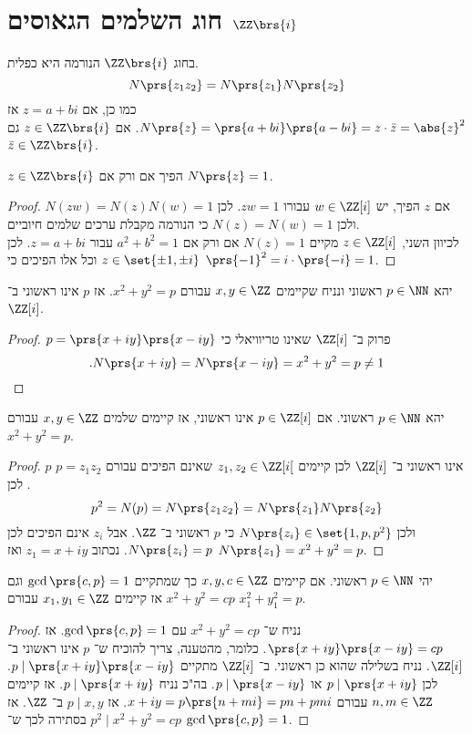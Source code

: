 \documentclass[a4paper,10pt,twoside,openany]{book}
\begin{document}
\section{חוג השלמים הגאוסים
$\ZZ\brs{i}$}
\begin{remark}
בחוג
$\ZZ\brs{i}$
הנורמה היא כפלית.
\[N\prs{z_1 z_2} = N\prs{z_1} N\prs{z_2}\]
כמו כן, אם
$z = a+bi$
אז
$N\prs{z} = \prs{a+bi}\prs{a-bi}=z\cdot\bar{z} = \abs{z}^2$.
אם
$z \in \ZZ\brs{i}$
גם
$\bar{z} \in \ZZ\brs{i}$.
\end{remark}
\begin{proposition}
$z \in \ZZ\brs{i}$
הפיך אם ורק אם
$N\prs{z} = 1$.
\end{proposition}
\begin{proof}
אם
$z$
הפיך, יש
$w \in \ZZ[i]$
עבורו
$zw = 1$.
לכן
$N(zw) = N(z)N(w) = 1$
ולכן
$N(z) = N(w) = 1$
כי הנורמה מקבלת ערכים שלמים חיוביים.\\
לכיוון השני,
$z \in \ZZ[i]$
מקיים
$N(z) = 1$
אם ורק אם
$a^2 + b^2 = 1$
עבור
$z = a+bi$.
לכן
$z \in \set{\pm 1, \pm i}$
וכל אלו הפיכים כי
$\prs{-1}^2 = i \cdot \prs{-i} = 1$.
\end{proof}
\begin{proposition}
יהא
$p \in \NN$
ראשוני ונניח שקיימים
$x,y \in \ZZ$
עבורם
$x^2 + y^2 = p$.
אז
$p$
אינו ראשוני ב־%
$\ZZ[i]$.
\end{proposition}
\begin{proof}
$p = \prs{x+iy}\prs{x-iy}$
פרוק ב־%
$\ZZ[i]$
שאינו טריוויאלי כי
\[\text{.} N\prs{x+iy} = N\prs{x-iy} = x^2 + y^2 = p \neq 1\]
\end{proof}
\begin{proposition}
יהא
$p \in \NN$
ראשוני.
אם
$p \in \ZZ[i]$
אינו ראשוני, אז קיימים שלמים
$x,y \in \ZZ$
עבורם
$x^2 + y^2 = p$.
\end{proposition}
\begin{proof}
$p$
אינו ראשוני ב־%
$\ZZ[i]$
לכן קיימים
$z_1,z_2 \in \ZZ[i[$
שאינם הפיכים עבורם
$p = z_1 z_2$.
לכן
\[p^2 = N(p) = N\prs{z_1 z_2} = N\prs{z_1} N\prs{z_2}\]
ולכן
$N\prs{z_i} \in \set{1,p,p^2}$
כי
$p$
ראשוני ב־%
$\ZZ$.
אבל
$z_i$
אינם הפיכים לכן
$N\prs{z_i} = p$.
נכתוב
$z_1 = x+iy$
ואז
$N\prs{z_1} = x^2 + y^2 = p$.
\end{proof}
\begin{theorem}
יהי
$p \in \NN$
ראשוני.
אם קיימים
$x,y,c \in \ZZ$
כך שמתקיים
$\gcd\prs{c,p}=1$
וגם
$x^2 + y^2 = cp$
אז קיימים
$x_1,y_1 \in \ZZ$
עבורם
$x_1^2 + y_1^2 = p$.
\end{theorem}
\begin{proof}
נניח ש־%
$x^2 + y^2 = cp$
עם
$\gcd\prs{c,p} = 1$.
אז
$\prs{x+iy}\prs{x-iy} = cp$.
כלומר, מהטענה, צריך להוכיח ש־%
$p$
אינו ראשוני ב־%
$\ZZ[i]$.
נניח בשלילה שהוא כן ראשוני.
ב־%
$\ZZ[i]$
מתקיים
$p \mid \prs{x+iy}\prs{x-iy}$.
לכן
$p \mid \prs{x+iy}$
או
$p \mid \prs{x-iy}$.
בה"כ נניח
$p \mid \prs{x+iy}$.
אז קיימים
$n,m \in \ZZ$
עבורם
$x+iy = p\prs{n+mi} = pn + pmi$.
אז
$p \mid x,y$
ב־%
$\ZZ$.
אז
$p^2 \mid x^2 + y^2 = cp$
בסתירה לכך ש־%
$\gcd\prs{c,p} = 1$.
\end{proof}
\end{document}
